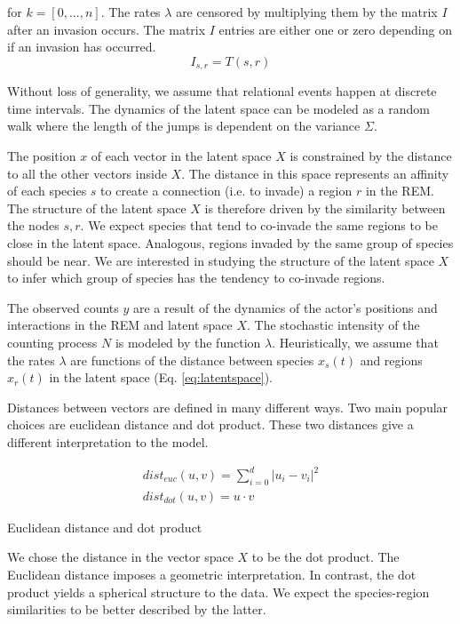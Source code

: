 \documentclass[mscthesis]{usiinfthesis}
\begin{document}
for $k = [0, ..., n]$. The rates $\lambda$ are censored by multiplying them by the matrix $I$ after an invasion occurs. The matrix $I$ entries are either one or zero depending on if an invasion has occurred.
\[
I_{s,r} = T(s,r)
\]

Without loss of generality, we assume that relational events happen at discrete time intervals. The dynamics of the latent space can be modeled as a random walk where the length of the jumps is dependent on the variance $\Sigma$.


The position $x$ of each vector in the latent space $X$ is constrained by the distance to all the other vectors inside $X$. The distance in this space represents an affinity of each species $s$ to create a connection (i.e. to invade) a region $r$ in the REM. The structure of the latent space $X$ is therefore driven by the similarity between the nodes $s, r$. We expect species that tend to co-invade the same regions to be close in the latent space. Analogous, regions invaded by the same group of species should be near. We are interested in studying the structure of the latent space $X$ to infer which group of species has the tendency to co-invade regions.


The observed counts $y$ are a result of the dynamics of the actor's positions and interactions in the REM and latent space $X$. The stochastic intensity of the counting process $N$ is modeled by the function $\lambda$. Heuristically, we assume that the rates $\lambda$ are functions of the distance between species $x_s(t)$ and regions $x_r(t)$ in the latent space (Eq. \ref{eq:latentspace}). 

Distances between vectors are defined in many different ways. Two main popular choices are euclidean distance and dot product. These two distances give a different interpretation to the model. 

\begin{eqfloat}
\begin{equation}
\begin{array}{l}
dist_{euc}(u, v) = \sum_{i=0}^d |u_i - v_i|^2 \\
dist_{dot}(u, v) = u \cdot v
\end{array}
\label{eq:distance_latentspace}
\end{equation}
\caption{Euclidean distance and dot product}
\end{eqfloat}

We chose the distance in the vector space $X$ to be the dot product. The Euclidean distance imposes a geometric interpretation. In contrast, the dot product yields a spherical structure to the data. We expect the species-region similarities to be better described by the latter.
\end{document}
